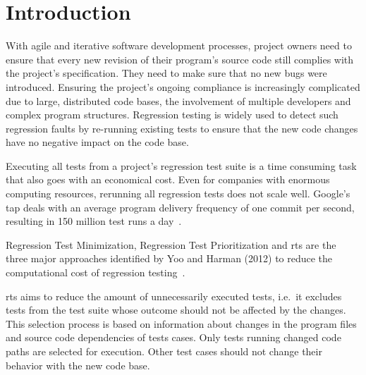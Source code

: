 \section{Introduction}\label{sec:intro}


With agile and iterative software development processes, 
project owners need to ensure that every new revision of their program's source code still
complies with the project's specification. They need to make sure that no new bugs were
introduced. Ensuring the project's ongoing compliance is
increasingly complicated due to large, distributed code bases, the involvement of multiple developers and 
complex program
structures. Regression testing is widely used to detect such regression faults by
re-running existing tests to ensure that the 
new code changes have no negative impact on the code base.\cite{rt_in_agile,rt_iterative}

Executing all tests from a project's regression test suite is a time consuming task that also goes
with an economical cost. Even for companies with enormous computing resources, rerunning all
regression tests does not scale well. Google's \ac{tap} deals with an average program delivery frequency of one commit per
second, resulting in 150 million test runs a day~\cite{7965447}.

Regression Test Minimization, Regression Test Prioritization and \acf{rts} are the three major approaches
identified by Yoo and Harman (2012) to reduce the computational cost of regression testing~\cite{regression_testing_reduction}. 

\ac{rts} aims to reduce the amount of
unnecessarily executed tests, i.e.~it excludes tests from the test suite whose outcome should not be
affected by the changes. This selection process is based on information about changes in the
program files and source code dependencies of tests cases. Only tests running changed code paths
are selected for execution. Other test cases should not change their behavior with the new code base.

